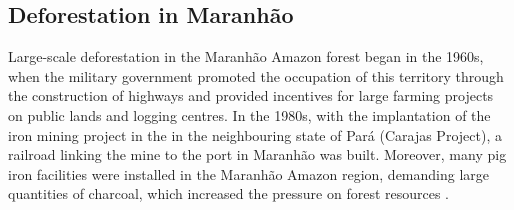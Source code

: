 


\subsection{Deforestation in Maranhão}


Large-scale deforestation in the Maranhão Amazon forest began in the 1960s, when the military government promoted the occupation of this territory through the construction of highways and provided incentives for large farming projects on public lands and logging centres. In the 1980s, with the implantation of the iron mining project in the in the neighbouring state of Pará (Carajas Project), a railroad linking the mine to the port in Maranhão was built. Moreover, many pig iron facilities were installed in the Maranhão Amazon region, demanding large quantities of charcoal, which increased the pressure on forest resources \citep{CELENTANO_2017}.

